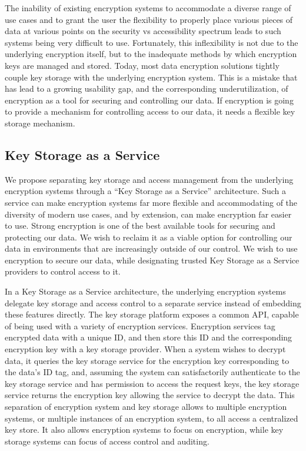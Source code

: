 The inability of existing encryption systems to accommodate a diverse
range of use cases and to grant the user the flexibility to properly
place various pieces of data at various points on the security vs
accessibility spectrum leads to such systems being very difficult to
use. Fortunately, this inflexibility is not due to the underlying
encryption itself, but to the inadequate methods by which encryption
keys are managed and stored. Today, most data encryption solutions
tightly couple key storage with the underlying encryption system. This
is a mistake that has lead to a growing usability gap, and the
corresponding underutilization, of encryption as a tool for securing
and controlling our data. If encryption is going to provide a
mechanism for controlling access to our data, it needs a flexible key
storage mechanism.

\subsection{Key Storage as a Service}

We propose separating key storage and access management from the
underlying encryption systems through a ``Key Storage as a Service''
architecture. Such a service can make encryption systems far more
flexible and accommodating of the diversity of modern use cases, and
by extension, can make encryption far easier to use. Strong encryption
is one of the best available tools for securing and protecting our
data. We wish to reclaim it as a viable option for controlling our
data in environments that are increasingly outside of our control. We
wish to use encryption to secure our data, while designating trusted
Key Storage as a Service providers to control access to it.

In a Key Storage as a Service architecture, the underlying encryption
systems delegate key storage and access control to a separate service
instead of embedding these features directly. The key storage platform
exposes a common API, capable of being used with a variety of
encryption services. Encryption services tag encrypted data with a
unique ID, and then store this ID and the corresponding encryption key
with a key storage provider. When a system wishes to decrypt data, it
queries the key storage service for the encryption key corresponding
to the data's ID tag, and, assuming the system can satisfactorily
authenticate to the key storage service and has permission to access the
request keys, the key storage service returns the encryption key
allowing the service to decrypt the data. This separation of encryption
system and key storage allows to multiple encryption systems, or
multiple instances of an encryption system, to all access a centralized
key store. It also allows encryption systems to focus on encryption,
while key storage systems can focus of access control and auditing.

